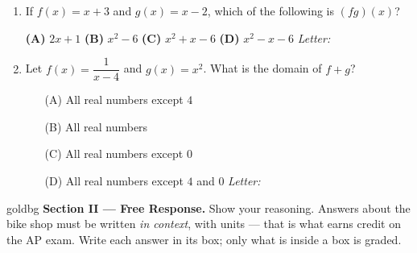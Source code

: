 \documentclass[10pt]{article}
\begin{document}
\begin{enumerate}[leftmargin=1.9em, itemsep=12pt]
\item If $f(x) = x + 3$ and $g(x) = x - 2$, which of the following is $(fg)(x)$?

      \smallskip
      \textbf{(A)} $2x + 1$ \hspace{2.0em} \textbf{(B)} $x^2 - 6$ \hspace{2.0em} \textbf{(C)} $x^2 + x - 6$ \hspace{2.0em} \textbf{(D)} $x^2 - x - 6$ \hfill\textit{Letter:}~\gradedblank[id=ap4, type=choice, points=1, answer=C]{0.42in}{13pt}

\boxguard[9]
\item Let $f(x) = \dfrac{1}{x - 4}$ and $g(x) = x^2$. What is the domain of $f + g$?
      \begin{enumerate}[leftmargin=2.6em, itemsep=2pt]
        \item[(A)] All real numbers except $4$
        \item[(B)] All real numbers
        \item[(C)] All real numbers except $0$
        \item[(D)] All real numbers except $4$ and $0$ \hfill\textit{Letter:}~\gradedblank[id=ap5, type=choice, points=1, answer=A]{0.42in}{13pt}
      \end{enumerate}

\end{enumerate}

\newpage

\begin{headlinebox}{goldbg}
\small
\textbf{Section II --- Free Response.} Show your reasoning. Answers about the bike shop must be
written \emph{in context}, with units --- that is what earns credit on the AP exam. Write each answer in its box; only what is inside a box is graded.
\end{headlinebox}

\vspace{0.08in}
\end{document}
